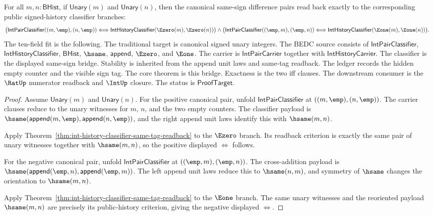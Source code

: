 \begin{theorem}
\label{thm:int-canonical-difference-pair-history-bridge}
For all $m,n:\mathsf{BHist}$, if $\mathsf{Unary}(m)$ and
$\mathsf{Unary}(n)$, then the canonical same-sign difference pairs read back
exactly to the corresponding public signed-history classifier branches:
$$
\bigl(
\mathsf{IntPairClassifier}((m,\emp),(n,\emp))
\Longleftrightarrow
\mathsf{IntHistoryClassifier}(\Ezero(m),\Ezero(n))
\bigr)
\land
\bigl(
\mathsf{IntPairClassifier}((\emp,m),(\emp,n))
\Longleftrightarrow
\mathsf{IntHistoryClassifier}(\Eone(m),\Eone(n))
\bigr).
$$
The ten-field fit is the following. The traditional target is canonical signed
unary integers. The BEDC source consists of $\mathsf{IntPairClassifier}$,
$\mathsf{IntHistoryClassifier}$, $\mathsf{BHist}$, $\hsame$,
$\mathsf{append}$, $\Ezero$, and $\Eone$. The carrier is
$\mathsf{IntPairCarrier}$ together with $\mathsf{IntHistoryCarrier}$. The
classifier is the displayed same-sign bridge. Stability is inherited from the
append unit laws and same-tag readback. The ledger records the hidden empty
counter and the visible sign tag. The core theorem is this bridge. Exactness is
the two iff clauses. The downstream consumer is the $\RatUp$ numerator
readback and $\IntUp$ closure. The status is $\mathsf{ProofTarget}$.
\end{theorem}
\begin{proof}
Assume $\mathsf{Unary}(m)$ and $\mathsf{Unary}(n)$. For the positive canonical
pair,
unfold $\mathsf{IntPairClassifier}$ at $((m,\emp),(n,\emp))$. The carrier
clauses reduce to the unary witnesses for $m$, $n$, and the two empty counters.
The classifier payload is
$\hsame(\mathsf{append}(m,\emp),\mathsf{append}(n,\emp))$, and the right
append unit laws identify this with $\hsame(m,n)$.

Apply Theorem~\ref{thm:int-history-classifier-same-tag-readback} to the
$\Ezero$ branch. Its readback criterion is exactly the same pair of unary
witnesses together with $\hsame(m,n)$, so the positive displayed
$\Longleftrightarrow$ follows.

For the negative canonical pair, unfold $\mathsf{IntPairClassifier}$ at
$((\emp,m),(\emp,n))$. The cross-addition payload is
$\hsame(\mathsf{append}(\emp,n),\mathsf{append}(\emp,m))$. The left append unit
laws reduce this to $\hsame(n,m)$, and symmetry of $\hsame$ changes the
orientation to $\hsame(m,n)$.

Apply Theorem~\ref{thm:int-history-classifier-same-tag-readback} to the
$\Eone$ branch. The same unary witnesses and the reoriented payload
$\hsame(m,n)$ are precisely its public-history criterion, giving the negative
displayed $\Longleftrightarrow$.
\end{proof}

